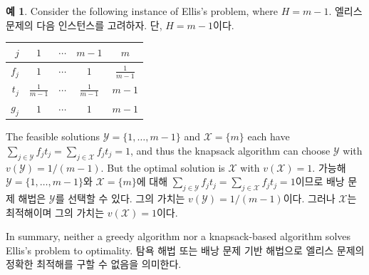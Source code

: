 \documentclass[11pt]{article} %
\theoremstyle{definition}
\newtheorem{example}{Example}
\theoremstyle{definition}
\newtheorem{example}{예}
\begin{document}
\fi
\begin{example} \label{knapsackheuristicellis}
\ifen Consider the following instance of Ellis's problem, where $H = m-1$.
\else 엘리스 문제의 다음 인스턴스를 고려하자. 단, $H = m-1$이다. \fi
\begin{center}
\begin{tabular}{r|cccc}
$j$   & $1$            & $\cdots$ & $m-1$          & $m$            \\ \hline
$f_j$ & $1$            &  $\cdots$ & $1$            & $\frac{1}{m-1}$ \\
$t_j$ & $\frac{1}{m-1}$ &  $\cdots$ & $\frac{1}{m-1}$ & $m-1$          \\
$g_j$ & $1$            &  $\cdots$ & $1$            & $m-1$         
\end{tabular}%
\end{center}
\ifen
The feasible solutions $\mathcal{Y} = \{1, \dots, m-1\}$ and $\mathcal{X} = \{ m\}$ each have $\sum_{j \in \mathcal{Y}} f_j t_j = \sum_{j \in \mathcal{X}} f_j t_j =  1$, and thus the knapsack algorithm can choose $\mathcal{Y}$ with $v(\mathcal{Y}) = 1/(m-1)$. But the optimal solution is  $\mathcal{X}$ with $v(\mathcal{X}) =  1$. 
\else
가능해 $\mathcal{Y} = \{1, \dots, m-1\}$와 $\mathcal{X} = \{ m\}$에 대해 $\sum_{j \in \mathcal{Y}} f_j t_j = \sum_{j \in \mathcal{X}} f_j t_j =  1$이므로 배낭 문제 해법은  $\mathcal{Y}$를 선택할 수 있다. 그의 가치는 $v(\mathcal{Y}) = 1/(m-1)$이다. 그러나 $\mathcal{X}$는 최적해이며 그의 가치는 $v(\mathcal{X}) =  1$이다.
\fi
\end{example}

\ifen 
In summary, neither a greedy algorithm nor a knapsack-based algorithm solves Ellis's problem to optimality. 
\else
탐욕 해법 또는 배낭 문제 기반 해법으로 엘리스 문제의 정확한 최적해를 구할 수 없음을 의미한다.
\fi
\end{document}
